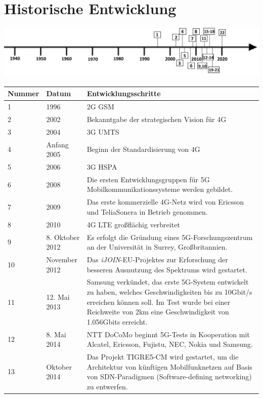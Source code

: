 \section*{Historische Entwicklung}
\includegraphics[width=\textwidth]{Kapitel/5G/Grafiken/Zeitstrahl}
\par
\noindent
\begin{tabular}{|p{1 cm}|p{3 cm}|p{13.55 cm}|}
	\hline
	Nummer & Datum & Entwicklungsschritte~\cite{5g.1}\\
	\hline
	1 & 1996 & 2G GSM \\
	\hline
	2 & 2002 & Bekanntgabe der strategischen Vision für 4G\cite{5g.5} \\
	\hline
	3 & 2004 & 3G UMTS\\
	\hline 
	4 & Anfang 2005 & Beginn der Standardisierung von 4G\cite{5g.5} \\
	\hline
	5 & 2006 & 3G HSPA\\
	\hline
	6 & 2008 & Die ersten Entwicklungsgruppen für 5G Mobilkommunikationssysteme werden gebildet.\\
	\hline
	7 & 2009 & Das erste kommerzielle 4G-Netz wird von Ericsson und TeliaSonera in Betrieb genommen. \\
	\hline
	8 & 2010 & 4G LTE großflächig verbreitet \\
	\hline
	9 & 8. Oktober 2012 & Es erfolgt die Gründung eines 5G-Forschungszentrum an der Universität in Surrey, Großbritannien. \\
	\hline
	10 & November 2012 & Das \textit{iJOIN}-EU-Projektes zur Erforschung der besseren Ausnutzung des Spektrums wird gestartet. \\
	\hline
	11 & 12. Mai 2013 & Samsung verkündet, das erste 5G-System entwickelt zu haben, welches Geschwindigkeiten bis zu 10Gbit/s erreichen können soll. Im Test wurde bei einer Reichweite von 2km eine Geschwindigkeit von 1.056Gbits erreicht. \\
	\hline
	12 & 8. Mai 2014 & NTT DoCoMo beginnt 5G-Tests in Kooperation mit Alcatel, Ericsson, Fujistu, NEC, Nokia und Samsung. \\
	\hline
	13 & Oktober 2014 & Das Projekt TIGRE5-CM wird gestartet, um die Architektur von künftigen Mobilfunknetzen auf Basis von SDN-Paradigmen (Software-defining networking) zu entwerfen. \\

\end{tabular}
